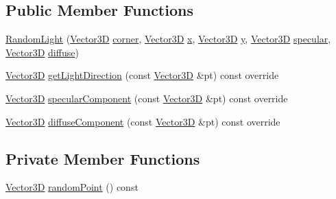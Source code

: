 \subsection*{Public Member Functions}
\begin{DoxyCompactItemize}
\item 
\mbox{\hyperlink{classRandomLight_aaa458e28a15e5ac83b393dc689def3a3}{Random\+Light}} (\mbox{\hyperlink{classVector3D}{Vector3D}} \mbox{\hyperlink{classRandomLight_ac54b3aa2ddb79d7f7363f64ed0f96989}{corner}}, \mbox{\hyperlink{classVector3D}{Vector3D}} \mbox{\hyperlink{classRandomLight_a5582baaa81ff0117f66ef8f3636859ed}{x}}, \mbox{\hyperlink{classVector3D}{Vector3D}} \mbox{\hyperlink{classRandomLight_a9d9e2fcde9c0d83b655f9a259d54a6d8}{y}}, \mbox{\hyperlink{classVector3D}{Vector3D}} \mbox{\hyperlink{classRandomLight_ac8014c223873c92490dfb697cc4663d4}{specular}}, \mbox{\hyperlink{classVector3D}{Vector3D}} \mbox{\hyperlink{classRandomLight_a26ffb2886dbb56b24d77fd8c760c8b28}{diffuse}})
\item 
\mbox{\hyperlink{classVector3D}{Vector3D}} \mbox{\hyperlink{classRandomLight_a70c038d63e66f520a296dccddcf9035f}{get\+Light\+Direction}} (const \mbox{\hyperlink{classVector3D}{Vector3D}} \&pt) const override
\item 
\mbox{\hyperlink{classVector3D}{Vector3D}} \mbox{\hyperlink{classRandomLight_af9922ba2ce0c9dc16026db945d8f1506}{specular\+Component}} (const \mbox{\hyperlink{classVector3D}{Vector3D}} \&pt) const override
\item 
\mbox{\hyperlink{classVector3D}{Vector3D}} \mbox{\hyperlink{classRandomLight_a371cbc5df30db46ac53cd0a9be91ac52}{diffuse\+Component}} (const \mbox{\hyperlink{classVector3D}{Vector3D}} \&pt) const override
\end{DoxyCompactItemize}
\subsection*{Private Member Functions}
\begin{DoxyCompactItemize}
\item 
\mbox{\hyperlink{classVector3D}{Vector3D}} \mbox{\hyperlink{classRandomLight_a93dbec116e6de441d4f0bd090a83e985}{random\+Point}} () const
\end{DoxyCompactItemize}
